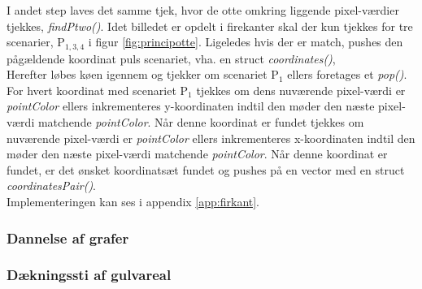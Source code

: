 I andet step laves det samme tjek, hvor de otte omkring liggende pixel-værdier tjekkes, \emph{findPtwo()}. Idet billedet er opdelt i firekanter skal der kun tjekkes for tre scenarier, P\(_{1, 3, 4}\) i figur \ref{fig:principotte}. Ligeledes hvis der er match, pushes den pågældende koordinat puls scenariet, vha. en struct \emph{coordinates()},\\
Herefter løbes køen igennem og tjekker om scenariet P\(_{1}\) ellers foretages et \emph{pop()}. For hvert koordinat med scenariet P\(_{1}\) tjekkes om dens nuværende pixel-værdi er \emph{pointColor} ellers inkrementeres y-koordinaten indtil den møder den næste pixel-værdi matchende \emph{pointColor}. Når denne koordinat er fundet tjekkes om nuværende pixel-værdi er \emph{pointColor} ellers inkrementeres x-koordinaten indtil den møder den næste pixel-værdi matchende \emph{pointColor}. Når denne koordinat er fundet, er det ønsket koordinatsæt fundet og pushes på en vector med en struct \emph{coordinatesPair()}.\\
Implementeringen kan ses i appendix \ref{app:firkant}. 

\subsubsection{Dannelse af grafer}

\subsubsection{Dækningssti af gulvareal}